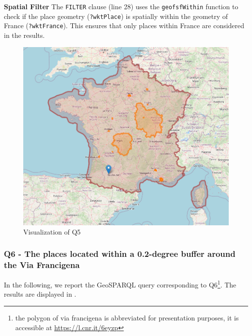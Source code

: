 \textbf{Spatial Filter}
The \texttt{FILTER} clause (line 28) uses the \texttt{\gls{geof}sfWithin} function to check if the place geometry (\texttt{?wktPlace}) is spatially within the geometry of France (\texttt{?wktFrance}). This ensures that only places within France are considered in the results.

\begin{figure}[h!tb]
    \centerline {\includegraphics[scale=0.6]{img/france.png}}
    \caption{Visualization of Q5}
    \label{fig:france}
\end{figure}


\subsubsection*{Q6 - The places located within a 0.2-degree buffer around the Via Francigena}
In the following, we report the GeoSPARQL query corresponding to Q6\footnote{the polygon of via francigena is abbreviated for presentation purposes, it is accessible at \url{https://l.cnr.it/6eyzp}}. The results are displayed in .


